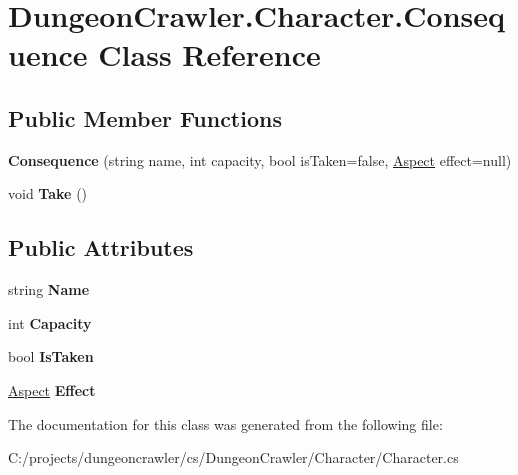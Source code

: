 \hypertarget{class_dungeon_crawler_1_1_character_1_1_consequence}{}\section{Dungeon\+Crawler.\+Character.\+Consequence Class Reference}
\label{class_dungeon_crawler_1_1_character_1_1_consequence}
\subsection*{Public Member Functions}
\begin{DoxyCompactItemize}
\item 
\hypertarget{class_dungeon_crawler_1_1_character_1_1_consequence_ad8642b949789aaea7d22e38f6b3778dd}{}{\bfseries Consequence} (string name, int capacity, bool is\+Taken=false, \hyperlink{class_dungeon_crawler_1_1_core_1_1_aspect}{Aspect} effect=null)\label{class_dungeon_crawler_1_1_character_1_1_consequence_ad8642b949789aaea7d22e38f6b3778dd}

\item 
\hypertarget{class_dungeon_crawler_1_1_character_1_1_consequence_ad9944b48d59878f68d5339ba5add1db5}{}void {\bfseries Take} ()\label{class_dungeon_crawler_1_1_character_1_1_consequence_ad9944b48d59878f68d5339ba5add1db5}

\end{DoxyCompactItemize}
\subsection*{Public Attributes}
\begin{DoxyCompactItemize}
\item 
\hypertarget{class_dungeon_crawler_1_1_character_1_1_consequence_a0b0cf26945a8efb3402b955098693b47}{}string {\bfseries Name}\label{class_dungeon_crawler_1_1_character_1_1_consequence_a0b0cf26945a8efb3402b955098693b47}

\item 
\hypertarget{class_dungeon_crawler_1_1_character_1_1_consequence_ab6931c76cc48bf013f71a7128df9decf}{}int {\bfseries Capacity}\label{class_dungeon_crawler_1_1_character_1_1_consequence_ab6931c76cc48bf013f71a7128df9decf}

\item 
\hypertarget{class_dungeon_crawler_1_1_character_1_1_consequence_ab01e2cf751dff41dc90dd550991e8dda}{}bool {\bfseries Is\+Taken}\label{class_dungeon_crawler_1_1_character_1_1_consequence_ab01e2cf751dff41dc90dd550991e8dda}

\item 
\hypertarget{class_dungeon_crawler_1_1_character_1_1_consequence_aef0467da62c63e37bf27527dded9871f}{}\hyperlink{class_dungeon_crawler_1_1_core_1_1_aspect}{Aspect} {\bfseries Effect}\label{class_dungeon_crawler_1_1_character_1_1_consequence_aef0467da62c63e37bf27527dded9871f}

\end{DoxyCompactItemize}


The documentation for this class was generated from the following file\+:\begin{DoxyCompactItemize}
\item 
C\+:/projects/dungeoncrawler/cs/\+Dungeon\+Crawler/\+Character/Character.\+cs\end{DoxyCompactItemize}
